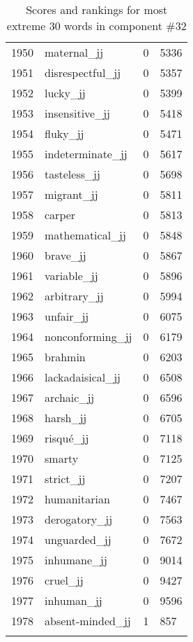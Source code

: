 \begin{longtable}[!htbp]{| rlr@{.}l |}
    1950 & maternal\_jj & 0 & 5336 \\
    1951 & disrespectful\_jj & 0 & 5357 \\
    1952 & lucky\_jj & 0 & 5399 \\
    1953 & insensitive\_jj & 0 & 5418 \\
    1954 & fluky\_jj & 0 & 5471 \\
    1955 & indeterminate\_jj & 0 & 5617 \\
    1956 & tasteless\_jj & 0 & 5698 \\
    1957 & migrant\_jj & 0 & 5811 \\
    1958 & carper & 0 & 5813 \\
    1959 & mathematical\_jj & 0 & 5848 \\
    1960 & brave\_jj & 0 & 5867 \\
    1961 & variable\_jj & 0 & 5896 \\
    1962 & arbitrary\_jj & 0 & 5994 \\
    1963 & unfair\_jj & 0 & 6075 \\
    1964 & nonconforming\_jj & 0 & 6179 \\
    1965 & brahmin & 0 & 6203 \\
    1966 & lackadaisical\_jj & 0 & 6508 \\
    1967 & archaic\_jj & 0 & 6596 \\
    1968 & harsh\_jj & 0 & 6705 \\
    1969 & risqué\_jj & 0 & 7118 \\
    1970 & smarty & 0 & 7125 \\
    1971 & strict\_jj & 0 & 7207 \\
    1972 & humanitarian & 0 & 7467 \\
    1973 & derogatory\_jj & 0 & 7563 \\
    1974 & unguarded\_jj & 0 & 7672 \\
    1975 & inhumane\_jj & 0 & 9014 \\
    1976 & cruel\_jj & 0 & 9427 \\
    1977 & inhuman\_jj & 0 & 9596 \\
    1978 & absent-minded\_jj & 1 & 857 \\
    \hline
    \caption{Scores and rankings for most extreme 30 words in component \#32} \\
\end{longtable}
